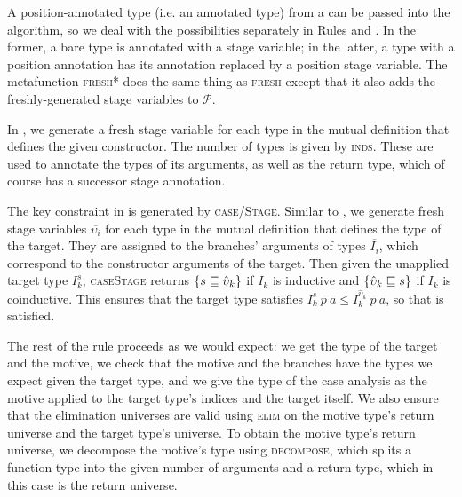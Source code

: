 \documentclass[sigplan,10pt,anonymous,review]{acmart}
\begin{document}
A position-annotated type (i.e. an annotated \corecursive type) from a \cofixpoint can be passed into the algorithm, so we deal with the possibilities separately in Rules  and . In the former, a bare \coinductive type is annotated with a stage variable; in the latter, a \coinductive type with a position annotation has its annotation replaced by a position stage variable. The metafunction \textsc{fresh*} does the same thing as \textsc{fresh} except that it also adds the freshly-generated stage variables to $\mathcal{P}$.

In , we generate a fresh stage variable for each \coinductive type in the mutual definition that defines the given constructor. The number of types is given by \textsc{inds}. These are used to annotate the types of its \coinductive arguments, as well as the return type, which of course has a successor stage annotation.

The key constraint in  is generated by \textsc{case\-/Stage}. Similar to , we generate fresh stage variables $\overline{\upsilon_i}$ for each \coinductive type in the mutual definition that defines the type of the target. They are assigned to the branches' arguments of types $\overline{I_i}$, which correspond to the constructor arguments of the target. Then given the unapplied target type $I_k^s$, \textsc{caseStage} returns $\{s \sqsubseteq \hat{\upsilon}_k\}$ if $I_k$ is inductive and $\{\hat{\upsilon}_k \sqsubseteq s\}$ if $I_k$ is coinductive. This ensures that the target type satisfies $I_k^s\ \overline{p}\ \overline{a} \leq I_k^{\hat{\upsilon}_k}\ \overline{p}\ \overline{a}$, so that  is satisfied.

The rest of the rule proceeds as we would expect: we get the type of the target and the motive, we check that the motive and the branches have the types we expect given the target type, and we give the type of the case analysis as the motive applied to the target type's indices and the target itself. We also ensure that the elimination universes are valid using \textsc{elim} on the motive type's return universe and the target type's universe. To obtain the motive type's return universe, we decompose the motive's type using \textsc{decompose}, which splits a function type into the given number of arguments and a return type, which in this case is the return universe.
\end{document}
